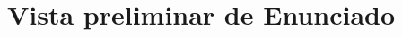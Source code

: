 \documentclass[a4paper,12pt]{article}\usepackage[spanish]{babel}\usepackage{times}
\title{Vista preliminar de Enunciado}
\begin{document}
\twocolumn 

\maketitle


 \newline 
\end{document}
